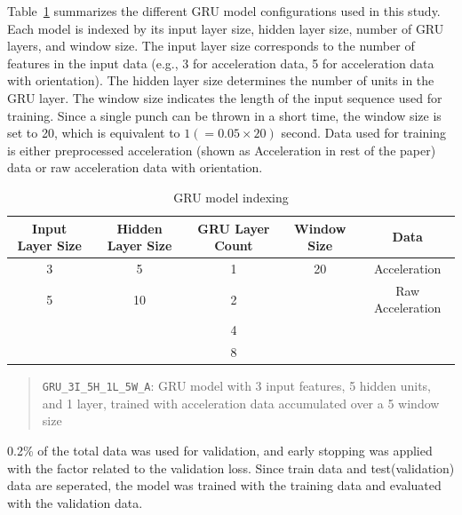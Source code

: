 \documentclass{article}
\begin{document}
    Table~\ref{tab:gru_model_indexing} summarizes the different GRU model
    configurations used in this study. Each model is indexed by its input layer size,
    hidden layer size, number of GRU layers, and window size. The input layer size
    corresponds to the number of features in the input data (e.g., 3 for
    acceleration data, 5 for acceleration data with orientation). The hidden layer
    size determines the number of units in the GRU layer. The window size
    indicates the length of the input sequence used for training. Since a single
    punch can be thrown in a short time, the window size is set to 20, which is equivalent
    to $1(= 0.05 \times 20)$ second. Data used for training is either
    preprocessed acceleration (shown as Acceleration in rest of the paper) data
    or raw acceleration data with orientation.

    \begin{table}[ht]
        \centering
        \begin{tabular}{ |c|c|c|c|c| }
            \hline
            Input Layer Size & Hidden Layer Size & GRU Layer Count & Window Size & Data             \\
            \hline
            3                & 5                 & 1               & 20          & Acceleration     \\
            5                & 10                & 2               &             & Raw Acceleration \\
                             &                   & 4               &             &                  \\
                             &                   & 8               &             &                  \\
            [1ex]             \hline
        \end{tabular}
        \caption{GRU model indexing}
        \label{tab:gru_model_indexing}
    \end{table}

    \begin{center}
        \begin{quote}
            \texttt{GRU\_3I\_5H\_1L\_5W\_A}: GRU model with 3 input features, 5
            hidden units, and 1 layer, trained with acceleration data
            accumulated over a 5 window size
        \end{quote}
    \end{center}

    0.2\% of the total data was used for validation, and early stopping was
    applied with the factor related to the validation loss. Since train data and
    test(validation) data are seperated, the model was trained with the training
    data and evaluated with the validation data.
\end{document}
